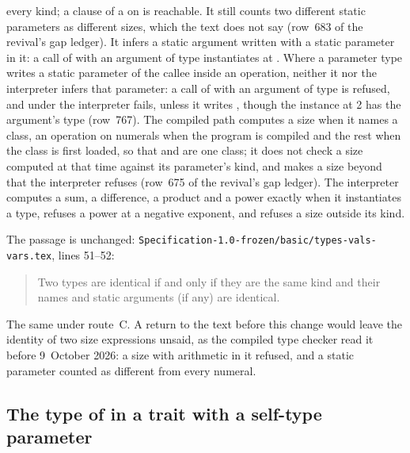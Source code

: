 \begin{description}
every kind; a clause
 of a  on
 is reachable.
It still counts two different static parameters as different sizes, which the
text does not say (row~683 of the revival's gap ledger).
It infers a static argument written with a static parameter in it: a call of
with an argument of type  instantiates
 at .
Where a parameter type writes a static parameter of the callee inside an
operation, neither it nor the interpreter infers that parameter: a call of
with an argument of type  is refused, and
under the interpreter fails, unless it writes
, though the instance at 2 has the
argument's type (row~767).
The compiled path computes a size when it names a class, an operation on
numerals when the program is compiled and the rest when the class is first
loaded, so that  and
 are one class; it does not check a size
computed at that time against its parameter's kind, and makes a size beyond
 that the interpreter refuses (row~675 of the revival's
gap ledger).
The interpreter computes a sum, a difference, a product and a power exactly
when it instantiates a type, refuses a power at a negative exponent, and
refuses a size outside its kind.
\item[Original text] The passage is unchanged:
\nolinkurl{Specification-1.0-frozen/basic/types-vals-vars.tex}, lines 51--52:
\begin{quote}
Two types are identical if and only if they are the same kind and
their names and static arguments (if any) are identical.
\end{quote}
\item[Route C] The same under route~C.
A return to the text before this change would leave the identity of two size
expressions unsaid, as the compiled type checker read it before 9~October
2026: a size with arithmetic in it refused, and a static parameter counted as
different from every numeral.
\end{description}

\subsection{The type of  in a trait with a self-type parameter}

